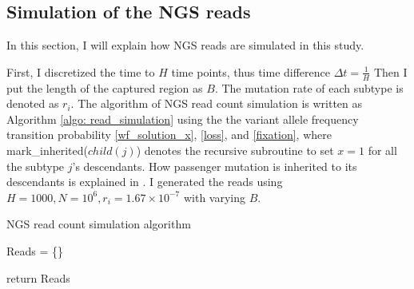 \documentclass{article}
\begin{document}
\subsection{Simulation of the NGS reads}
In this section, I will explain how NGS reads are simulated in this study.

First, I discretized the time to $H$ time points, thus time difference $\varDelta t = \frac{1}{H}$
Then I put the length of the captured region as $B$. The mutation rate of each subtype is denoted as $r_i$.
The algorithm of NGS read count simulation is written as Algorithm \ref{algo: read_simulation} using the the variant allele frequency transition probability \eqref{wf_solution_x}, \eqref{loss}, and \eqref{fixation}, where mark\_inherited($child(j)$) denotes the recursive subroutine to set $x = 1$ for all the subtype $j$'s descendants.
How passenger mutation is inherited to its descendants is explained in .
I generated the reads using $H=1000, N=10^6, r_i = 1.67\times 10^{-7}$ with varying $B$.

 \begin{algorithm}[H]
  \caption{NGS read count simulation algorithm}
  \label{algo: read_simulation}
  Reads = \{\}
  
  return Reads
\end{algorithm}
  
\end{document}
